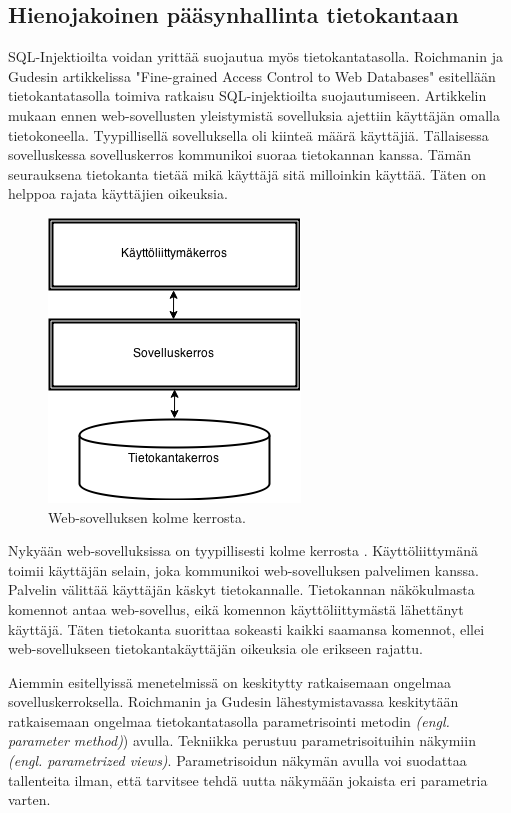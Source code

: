 \documentclass[finnish]{tktltiki2}
\theoremstyle{definition}
\theoremstyle{remark}
\begin{document}
		\subsection{Hienojakoinen pääsynhallinta tietokantaan}
		SQL-Injektioilta voidan yrittää suojautua myös tietokantatasolla. Roichmanin ja Gudesin artikkelissa "Fine-grained Access Control to Web Databases"\space\cite{access} esitellään tietokantatasolla toimiva ratkaisu SQL-injektioilta suojautumiseen. Artikkelin mukaan ennen web-sovellusten yleistymistä sovelluksia ajettiin käyttäjän omalla tietokoneella. Tyypillisellä sovelluksella oli kiinteä määrä  käyttäjiä. Tällaisessa sovelluskessa sovelluskerros kommunikoi suoraa tietokannan kanssa. Tämän seurauksena tietokanta tietää mikä käyttäjä sitä milloinkin käyttää. Täten on helppoa rajata käyttäjien oikeuksia.
						 \begin{figure}[h]
						 	\centering
						 	\caption{Web-sovelluksen kolme kerrosta.}
						 	\includegraphics[scale=0.55]{kandi2}
						 \end{figure}
				 
				 
		 Nykyään web-sovelluksissa on tyypillisesti kolme kerrosta \cite{access}\cite{3tier}. Käyttöliittymänä toimii käyttäjän selain, joka kommunikoi web-sovelluksen palvelimen kanssa. Palvelin välittää käyttäjän käskyt tietokannalle. Tietokannan näkökulmasta komennot antaa web-sovellus, eikä komennon käyttöliittymästä lähettänyt käyttäjä. Täten tietokanta suorittaa sokeasti kaikki saamansa komennot, ellei web-sovellukseen tietokantakäyttäjän oikeuksia ole erikseen rajattu.
		

		 
		
		Aiemmin esitellyissä menetelmissä on keskitytty ratkaisemaan ongelmaa sovelluskerroksella. Roichmanin ja Gudesin lähestymistavassa keskitytään ratkaisemaan ongelmaa tietokantatasolla parametrisointi metodin \textit{(engl. parameter method)}) avulla. Tekniikka perustuu parametrisoituihin näkymiin \textit{(engl. parametrized views)}. Parametrisoidun näkymän avulla voi suodattaa tallenteita ilman, että tarvitsee tehdä uutta näkymään jokaista eri parametria varten.
		
\end{document}
